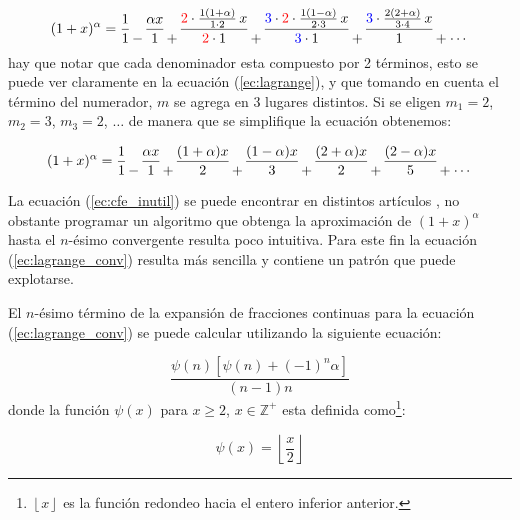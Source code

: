 	\begin{equation}
 		(1 + x)^{\alpha} = \frac{1}{1} \genfrac{}{}{0pt}{0}{}{-} \frac{\alpha x}{1} \genfrac{}{}{0pt}{0}{}{+}  \frac{ {\color{red} 2} \cdot \frac{1(1 + \alpha)}{1\cdot2}\,x}{{\color{red} 2} \cdot 1} \genfrac{}{}{0pt}{0}{}{+} \frac{ {\color{blue} 3} \cdot {\color{red} 2} \cdot \frac{1(1 - \alpha)}{2\cdot3}\,x}{{\color{blue} 3} \cdot 1} \genfrac{}{}{0pt}{0}{}{+} \frac{{\color{blue} 3} \cdot \frac{2(2 + \alpha)}{3\cdot4}\,x}{1}   \genfrac{}{}{0pt}{0}{}{+} \genfrac{}{}{0pt}{0}{}{\cdots} 
	\end{equation}
	hay que notar que cada denominador esta compuesto por 2 términos, esto se puede ver claramente en la ecuación (\ref{ec:lagrange}), y que tomando en cuenta el término del numerador, $m$ se agrega en 3 lugares distintos. Si se eligen $m_{1} = 2$, $m_{2} = 3$, $m_{3} = 2$, $\ldots$ de manera que se simplifique la ecuación obtenemos:

	\begin{equation}
 		(1 + x)^{\alpha} = \frac{1}{1}  \genfrac{}{}{0pt}{0}{}{-} \frac{\alpha x}{1} \genfrac{}{}{0pt}{0}{}{+} \frac{(1 + \alpha)x}{2} \genfrac{}{}{0pt}{0}{}{+} \frac{(1 - \alpha)x}{3} \genfrac{}{}{0pt}{0}{}{+} \frac{(2 + \alpha)x}{2} \genfrac{}{}{0pt}{0}{}{+} \frac{(2-\alpha)x}{5} \genfrac{}{}{0pt}{0}{}{+} \genfrac{}{}{0pt}{0}{}{\cdots}
 		\label{ec:cfe_inutil}
	\end{equation}

	La ecuación (\ref{ec:cfe_inutil}) se puede encontrar en distintos artículos \cite{Krishna2008,Krishna2011}, no obstante programar un algoritmo que obtenga la aproximación de $(1 + x)^{\alpha}$ hasta el $n$-ésimo convergente resulta poco intuitiva. Para este fin la ecuación (\ref{ec:lagrange_conv}) resulta más sencilla y contiene un patrón que puede explotarse.

	El $n$-ésimo término de la expansión de fracciones continuas para la ecuación (\ref{ec:lagrange_conv}) se puede calcular utilizando la siguiente ecuación:

	\begin{equation}
		\frac{\psi(n) \left[ \psi(n) + (-1)^{n} \alpha \right]}{(n-1)n}
		\label{ec:calculo_terminos_cfe}
	\end{equation}
	donde la función $\psi(x)$ para $x\geq2$, $x\in \mathbb{Z}^{+}$ esta definida como\footnote{$\left\lfloor x\right\rfloor$ es  la función redondeo hacia el entero inferior anterior.}:

	\begin{equation}
		\psi(x) = \left\lfloor \frac{x}{2}\right\rfloor
	\end{equation}

